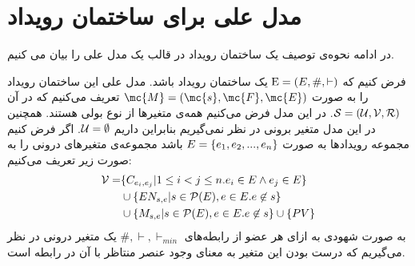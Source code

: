 \section{مدل علی برای ساختمان رویداد}
\label{es-causal-model}
در ادامه نحوه‌ی توصیف یک ساختمان رویداد در قالب یک مدل علی را بیان می کنیم.

فرض کنیم که
$\mathrm{E} = (E,\#,\vdash)$
یک ساختمان رویداد باشد.
مدل علی این ساختمان رویداد را به صورت
$\mc{M} = (\mc{s},\mc{F},\mc{E})$
تعریف می‌کنیم که در آن
$\mathcal{S} = (\mathcal{U},\mathcal{V},\mathcal{R})$.
در این مدل فرض می‌کنیم همه‌ی متغیر‌ها از نوع بولی هستند.
همچنین در این مدل متغیر برونی در نظر نمی‌گیریم بنابراین داریم
$\mathcal{U} = \emptyset$.
اگر فرض کنیم مجموعه‌ رویدادها به صورت
$E = \{e_1,e_2,...,e_n\}$
باشد مجموعه‌ی متغیر‌های درونی را به صورت زیر تعریف می‌کنیم:
\begin{align*}
    \mathcal{V} = & \{C_{e_i,e_j} |  1 \leq i < j \leq n.
    e_i \in E \wedge e_j \in E\}                              \\
                  & \cup \{EN_{s,e} | s \in \mathcal{P}(E),
    e \in E. e \not \in s \}                                  \\
                  & \cup \{M_{s,e} | s \in \mathcal{P}(E),
        e \in E. e \not \in s \} \cup \{PV\}
\end{align*}
به صورت شهودی به ازای هر عضو از رابطه‌های
$\#,\vdash,\vdash_{min}$
یک متغیر درونی در نظر می‌گیریم که درست بودن این متغیر به معنای وجود عنصر منتاظر با آن در رابطه است.

